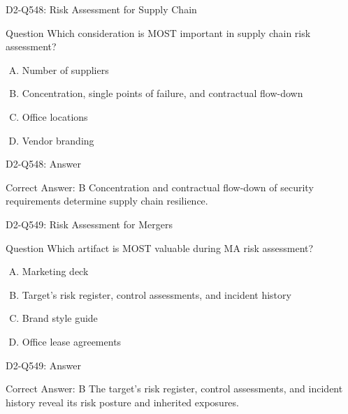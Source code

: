 \documentclass{beamer}
\begin{document}
	\begin{frame}{D2-Q548: Risk Assessment for Supply Chain}
		\begin{block}{Question}
			Which consideration is MOST important in supply chain risk assessment?
		\end{block}
		\begin{enumerate}[(A)]
			\item Number of suppliers
			\item Concentration, single points of failure, and contractual flow-down
			\item Office locations
			\item Vendor branding
		\end{enumerate}
	\end{frame}
	\begin{frame}{D2-Q548: Answer}
		\begin{block}{Correct Answer: B}
			Concentration and contractual flow-down of security requirements determine supply chain resilience.
		\end{block}
	\end{frame}
	
	\begin{frame}{D2-Q549: Risk Assessment for Mergers}
		\begin{block}{Question}
			Which artifact is MOST valuable during MA risk assessment?
		\end{block}
		\begin{enumerate}[(A)]
			\item Marketing deck
			\item Target's risk register, control assessments, and incident history
			\item Brand style guide
			\item Office lease agreements
		\end{enumerate}
	\end{frame}
	\begin{frame}{D2-Q549: Answer}
		\begin{block}{Correct Answer: B}
			The target's risk register, control assessments, and incident history reveal its risk posture and inherited exposures.
		\end{block}
	\end{frame}
	
\end{document}

